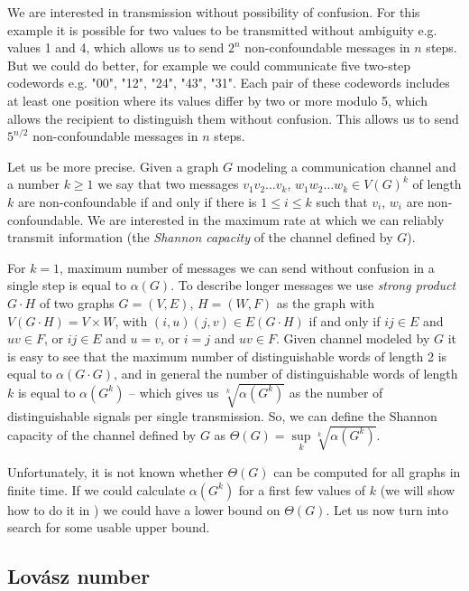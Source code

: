 We are interested in transmission without possibility of confusion. For this example it is possible for two values to be transmitted without ambiguity e.g. values 1 and 4, which allows us to send $2^n$ non-confoundable messages in $n$ steps. But we could do better, for example we could communicate five two-step codewords e.g. "00", "12", "24", "43", "31". Each pair of these codewords includes at least one position where its values differ by two or more modulo 5, which allows the recipient to distinguish them without confusion.  This allows us to send $5^{n / 2}$ non-confoundable messages in $n$ steps.

Let us be more precise. Given a graph $G$ modeling a communication channel and a number $k \geq 1$ we say that two messages $v_1v_2\ldots v_k$, $w_1w_2\ldots w_k \in V(G)^k$ of length $k$ are non-confoundable if and only if there is $1 \leq i \leq k$ such that $v_i$, $w_i$ are non-confoundable. We are interested in the maximum rate at which we can reliably transmit information (the \emph{Shannon capacity} of the channel defined by $G$).

For $k = 1$, maximum number of messages we can send without confusion in a single step is equal to $\alpha(G)$. To describe longer messages we use \emph{strong product} $G \cdot H$ of two graphs $G = (V, E)$, $H = (W, F)$ as the graph with $V(G \cdot H) = V \times W$, with $(i, u)(j, v) \in E(G \cdot H)$ if and only if $ij \in E$ and $uv \in F$, or $ij \in E$ and $u = v$, or $i = j$ and $uv \in F$. Given channel modeled by $G$ it is easy to see that the maximum number of distinguishable words of length 2 is equal to $\alpha(G \cdot G)$, and in general the number of distinguishable words of length $k$ is equal to $\alpha(G^k)$ -- which gives us $\sqrt[k]{\alpha(G^k)}$ as the number of distinguishable signals per single transmission. So, we can define the Shannon capacity of the channel defined by $G$ as $\Theta(G) = \sup\limits_k \sqrt[k]{\alpha(G^k)}$.

Unfortunately, it is not known whether $\Theta(G)$ can be computed for all graphs in finite time. If we could calculate $\alpha(G^k)$ for a first few values of $k$ (we will show how to do it in ) we could have a lower bound on $\Theta(G)$. Let us now turn into search for some usable upper bound.

\subsection{Lovász number}

